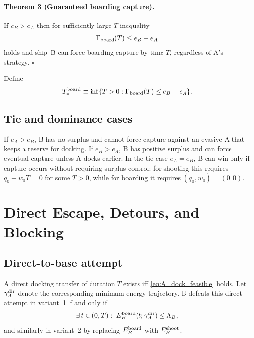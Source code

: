 \documentclass[journal, a4paper]{IEEEtran}
\begin{document}
\paragraph{Theorem 3 (Guaranteed boarding capture).}
If $e_B>e_A$ then for sufficiently large $T$ inequality
\begin{equation}
\Gamma_{\rm board}(T)\le e_B-e_A
\label{eq:board_guarantee}
\end{equation}
holds and ship~B can force boarding capture by time $T$, regardless of A's strategy.
\hfill$\square$

Define
\begin{equation}
T_*^{\rm board}
\equiv
\inf\{T>0:\Gamma_{\rm board}(T)\le e_B-e_A\}.
\end{equation}

\subsection{Tie and dominance cases}
If $e_A>e_B$, B has no surplus and cannot force capture against an evasive A that keeps a reserve for docking. If $e_B>e_A$, B has positive surplus and can force eventual capture unless A docks earlier. In the tie case $e_A=e_B$, B can win only if capture occurs without requiring surplus control: for shooting this requires $q_0+w_0T=0$ for some $T>0$, while for boarding it requires $(q_0,w_0)=(0,0)$.

\section{Direct Escape, Detours, and Blocking}
\label{sec:detour}

\subsection{Direct-to-base attempt}
A direct docking transfer of duration $T$ exists iff \eqref{eq:A_dock_feasible} holds.
Let $\gamma_A^{\rm dir}$ denote the corresponding minimum-energy trajectory.
B defeats this direct attempt in variant~1 if and only if
\begin{equation}
\exists\,t\in(0,T):\ 
E_B^{\rm board}(t;\gamma_A^{\rm dir})\le \Lambda_B,
\end{equation}
and similarly in variant~2 by replacing $E_B^{\rm board}$ with $E_B^{\rm shoot}$.
\end{document}
